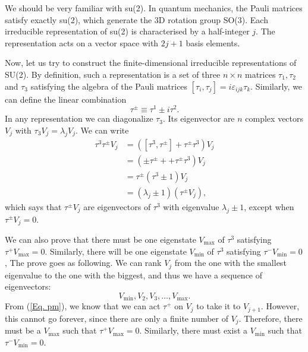 \documentclass[11pt]{article}
\theoremstyle{definition}
\begin{document}
We should be very familiar with su(2). In quantum mechanics, the Pauli matrices satisfy exactly su(2), which generate the 3D rotation group SO(3). Each irreducible representation of su(2) is characterised by a half-integer $j$. The representation acts on a vector space with $2j+1$ basis elements.
\begin{tcolorbox}[breakable, colback=yellow!20!white, colframe=black, boxrule=1pt]
    Now, let us try to construct the finite-dimensional irreducible representations of SU(2). By definition, such a representation is a set of three $n \times n$ matrices $\tau_1, \tau_2$ and $\tau_3$ satisfying the algebra of the Pauli matrices $[\tau_i, \tau_j] = i\varepsilon_{ijk}\tau_k$. Similarly, we can define the linear combination
    \begin{equation}
        \tau ^\pm \equiv \tau^1 \pm i \tau^2.
    \end{equation}
    In any representation we can diagonalize $\tau_3$. Its eigenvector are $n$ complex vectors $V_j$ with $\tau_3 V_j = \lambda_j V_j$. We can write
    \begin{equation}
    \begin{aligned}
        \tau^3 \tau^\pm V_j &= \left([\tau^3, \tau^\pm] + \tau^\pm \tau^3\right)V_j\\
        &= \left( \pm\tau^\pm + + \tau^\pm \tau^3\right)V_j\\
        &= \tau^\pm(\tau^3 \pm 1) V_j\\
        &= (\lambda_j \pm 1) (\tau^\pm V_j),
        \label{Eq. pm}
    \end{aligned}
    \end{equation}
    which says that $\tau^\pm V_j$ are eigenvectors of $\tau^3$ with eigenvalue $\lambda_j \pm 1$, except when $\tau^\pm V_j=0$.

    We can also prove that there must be one eigenstate $V_\text{max}$ of $\tau^3$ satisfying $\tau^+V_\text{max} = 0$. Similarly, there will be one eigenstate $V_\text{min}$ of  $\tau^3$ satisfying $\tau^-V_\text{min} = 0$, The prove goes as following. We can rank $V_j$ from the one with the smallest eigenvalue to the one with the biggest, and thus we have a sequence of eigenvectors:
    \begin{equation}
        V_\text{min}, V_2, V_3, \ldots, V_\text{max}.
    \end{equation}
    From (\ref{Eq. pm}), we know that we can act $\tau^+$ on $V_j$ to take it to $V_{j+1}$. However, this cannot go forever, since there are only a finite number of $V_j$. Therefore, there must be a $V_\text{max}$ such that $\tau^+ V_\text{max}=0$. Similarly, there must exist a $V_\text{min}$ such that $\tau^-V_\text{min} = 0$.


\end{tcolorbox}
\end{document}
